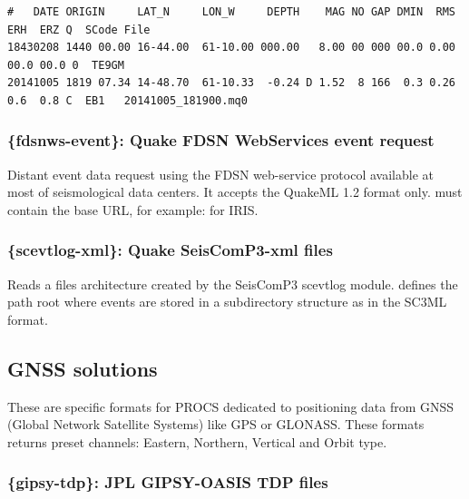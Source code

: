 \begin{lstlisting}[title=HYPO71 format example]
#   DATE ORIGIN     LAT_N     LON_W     DEPTH    MAG NO GAP DMIN  RMS  ERH  ERZ Q  SCode File
18430208 1440 00.00 16-44.00  61-10.00 000.00   8.00 00 000 00.0 0.00 00.0 00.0 0  TE9GM
20141005 1819 07.34 14-48.70  61-10.33  -0.24 D 1.52  8 166  0.3 0.26  0.6  0.8 C  EB1   20141005_181900.mq0
\end{lstlisting}


\subsubsection{\{fdsnws-event\}: Quake FDSN WebServices event request}

Distant event data request using the FDSN web-service protocol available at most of seismological data centers. It accepts the QuakeML 1.2 format only.  must contain the base URL, for example:  for IRIS.


\subsubsection{\{scevtlog-xml\}: Quake SeisComP3-xml files}

Reads a files architecture created by the SeisComP3 scevtlog module.  defines the path root where events are stored in a subdirectory structure as  in the SC3ML format.


\subsection{GNSS solutions}

These are specific formats for PROCS dedicated to positioning data from GNSS (Global Network Satellite Systems) like GPS or GLONASS. These formats returns preset channels: Eastern, Northern, Vertical and Orbit type.

\subsubsection{\{gipsy-tdp\}: JPL GIPSY-OASIS TDP files}

